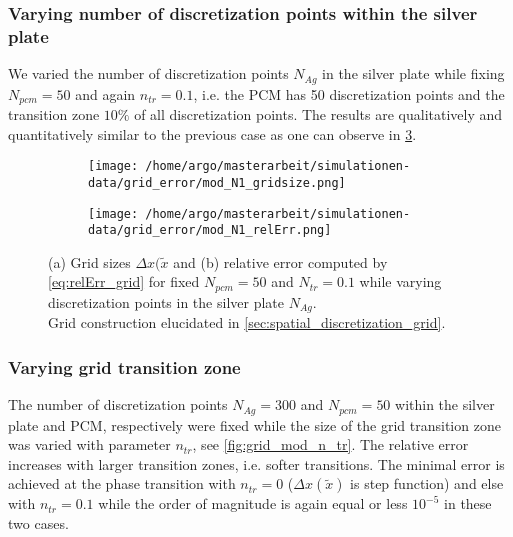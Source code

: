 \documentclass{scrartcl}[12pt, halfparskip]
\numberwithin{equation}{section}
\numberwithin{figure}{section}
\numberwithin{table}{section}
\begin{document}
\subsubsection{Varying number of discretization points within the silver plate}
We varied the number of discretization points $N_{Ag}$ in the silver plate while fixing $N_{pcm}=50$ and again $n_{tr}=0.1$, i.e. the PCM has 50 discretization points and the transition zone $10\%$ of all discretization points. The results are qualitatively and quantitatively similar to the previous case as one can observe in \cref{fig:grid_mod_N1}.


\begin{figure}[H]
	\begin{subfigure}{0.49\textwidth}
		\texttt{[image: /home/argo/masterarbeit/simulationen-data/grid\_error/mod\_N1\_gridsize.png]}
		\caption{}
		\label{fig:gridsize_mod_N1}
	\end{subfigure}
	\begin{subfigure}{0.49\textwidth}
		\texttt{[image: /home/argo/masterarbeit/simulationen-data/grid\_error/mod\_N1\_relErr.png]}
		\caption{}
		\label{fig:grid_relErr_mod_N1}
	\end{subfigure}
	\caption{(a) Grid sizes $\Delta x(\tilde{x}$ and (b) relative error computed by \cref{eq:relErr_grid} for fixed $N_{pcm}=50$ and $N_{tr}=0.1$ while varying discretization points in the silver plate $N_{Ag}$. \\
	Grid construction elucidated in \cref{sec:spatial_discretization_grid}.}
	\label{fig:grid_mod_N1}
\end{figure}


\subsubsection{Varying grid transition zone}
The number of discretization points $N_{Ag}=300$ and $N_{pcm}=50$ within the silver plate and PCM, respectively were fixed while the size of the grid transition zone was varied with parameter $n_{tr}$, see \cref{fig:grid_mod_n_tr}. The relative error increases with larger transition zones, i.e. softer transitions. The minimal error is achieved at the phase transition with $n_{tr}=0$ ($\Delta x(\tilde{x})$ is step function) and else with $n_{tr}=0.1$ while the order of magnitude is again equal or less $10^{-5}$ in these two cases.
\end{document}
